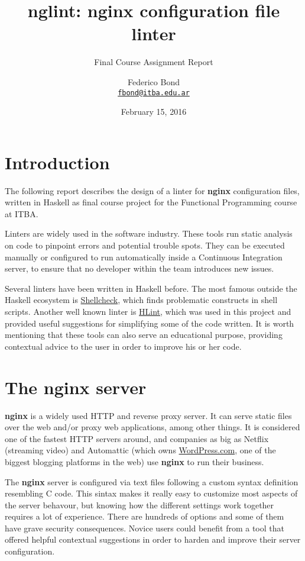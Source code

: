 \documentclass[]{article}
\title{nglint: nginx configuration file linter}
\subtitle{Final Course Assignment Report}
\author{Federico Bond \\
\texttt{\href{mailto:fbond@itba.edu.ar}{fbond@itba.edu.ar}} }
\date{February 15, 2016}
\begin{document}
\maketitle

\section{Introduction}\label{introduction}

The following report describes the design of a linter for \textbf{nginx}
configuration files, written in Haskell as final course project for the
Functional Programming course at ITBA.

Linters are widely used in the software industry. These tools run static
analysis on code to pinpoint errors and potential trouble spots. They
can be executed manually or configured to run automatically inside a
Continuous Integration server, to ensure that no developer within the
team introduces new issues.

Several linters have been written in Haskell before. The most famous
outside the Haskell ecosystem is
\href{http://www.shellcheck.net/}{Shellcheck}, which finds
problematic constructs in shell scripts. Another well known linter is
\href{https://github.com/ndmitchell/hlint}{HLint}, which was used in
this project and provided useful suggestions for simplifying some of the code
written. It is worth mentioning that these
tools can also serve an educational purpose, providing contextual advice
to the user in order to improve his or her code. 

\section{The \textbf{nginx} server}\label{nginx}

\textbf{nginx} is a widely used HTTP and reverse proxy server. It can
serve static files over the web and/or proxy web applications, among
other things. It is considered one of the fastest HTTP servers around, and
companies as big as Netflix (streaming video) and Automattic 
(which owns \href{https://wordpress.com/}{WordPress.com}, one of the biggest
blogging platforms in the web) use \textbf{nginx} to run their business.

The \textbf{nginx} server is configured via text files following a custom syntax definition
resembling C code. This sintax makes it really easy to customize most aspects
of the server behavour, but knowing how the different settings work together
requires a lot of experience. There are hundreds of options and some of them have grave security
consequences. Novice users could benefit from a tool that offered helpful
contextual suggestions in order to harden and improve their server configuration.
\end{document}
